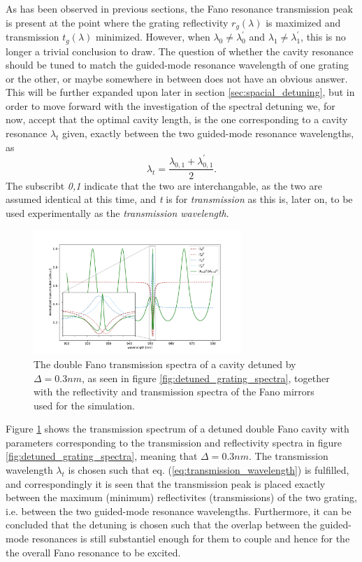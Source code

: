 As has been observed in previous sections, the Fano resonance transmission peak is present at the point where the grating reflectivity $r_g(\lambda)$ is maximized and transmission $t_g(\lambda)$ minimized. However, when $\lambda_0 \neq \lambda_0^{\prime}$ and $\lambda_1 \neq \lambda_1^{\prime}$, this is no longer a trivial conclusion to draw. The question of whether the cavity resonance should be tuned to match the guided-mode resonance wavelength of one grating or the other, or maybe somewhere in between does not have an obvious answer. This will be further expanded upon later in section \ref{sec:spacial_detuning}, but in order to move forward with the investigation of the spectral detuning we, for now, accept that the optimal cavity length, is the one corresponding to a cavity resonance $\lambda_t$ given, exactly between the two guided-mode resonance wavelengths, as 
\begin{equation}
    \lambda_t = \frac{\lambda_{0,1} + \lambda_{0,1}^{\prime}}{2}.
    \label{eq:transmission_wavelength}
\end{equation}
The subscribt \emph{0,1} indicate that the two are interchangable, as the two are assumed identical at this time, and \emph{t} is for \emph{transmission} as this is, later on, to be used experimentally as the \emph{transmission wavelength}. 

\begin{figure}[h!]
    \centering
    \includegraphics[width=0.7\textwidth]{figures/detuned_full_range_double_trans.pdf}
    \caption{The double Fano transmission spectra of a cavity detuned by $\Delta = 0.3nm$, as seen in figure \ref{fig:detuned_grating_spectra}, together with the reflectivity and transmission spectra of the Fano mirrors used for the simulation.}
    \label{fig:detuned_double_fano_transmission}
\end{figure}

Figure \ref{fig:detuned_double_fano_transmission} shows the transmission spectrum of a detuned double Fano cavity with parameters corresponding to the transmission and reflectivity spectra in figure \ref{fig:detuned_grating_spectra}, meaning that $\Delta = 0.3nm$. The transmission wavelength $\lambda_t$ is chosen such that eq. (\ref{eq:transmission_wavelength}) is fulfilled, and correspondingly it is seen that the transmission peak is placed exactly between the maximum (minimum) reflectivites (transmissions) of the two grating, i.e. between the two guided-mode resonance wavelengths. Furthermore, it can be concluded that the detuning is chosen such that the overlap between the guided-mode resonances is still substantiel enough for them to couple and hence for the the overall Fano resonance to be excited. 

